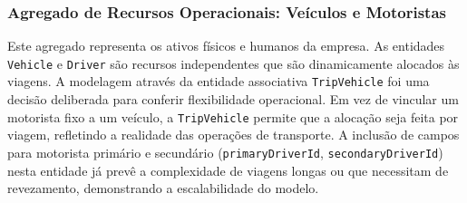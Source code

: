 \subsubsection*{Agregado de Recursos Operacionais: Veículos e Motoristas}

Este agregado representa os ativos físicos e humanos da empresa. As entidades \texttt{Vehicle} e \texttt{Driver} são recursos independentes que são dinamicamente alocados às viagens. A modelagem através da entidade associativa \texttt{TripVehicle} foi uma decisão deliberada para conferir flexibilidade operacional. Em vez de vincular um motorista fixo a um veículo, a \texttt{TripVehicle} permite que a alocação seja feita por viagem, refletindo a realidade das operações de transporte. A inclusão de campos para motorista primário e secundário (\texttt{primaryDriverId}, \texttt{secondaryDriverId}) nesta entidade já prevê a complexidade de viagens longas ou que necessitam de revezamento, demonstrando a escalabilidade do modelo.

